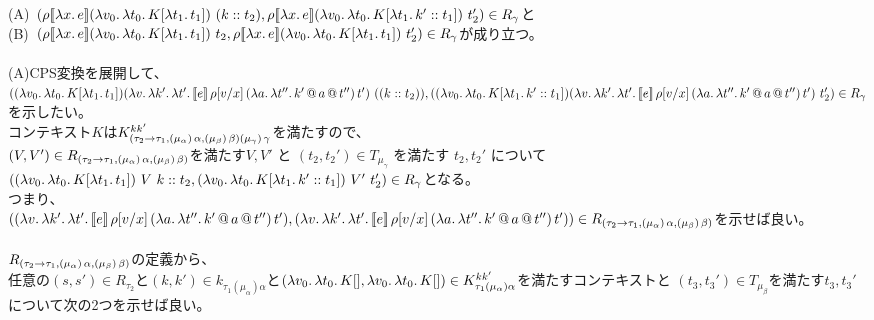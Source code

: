 \documentclass[japanese,draft]{jssst_ppl} %
\begin{document}
  (A)\ $(\rho \CPSTh{\Lam{x}{e}} \LamP{v_0}{\Lam{t_0}{K[\Lam{t_1}{t_1}]}}\ \ConsP{k}{t_2}, \rho \CPSTh{\Lam{x}{e}} \LamP{v_0}{\Lam{t_0}{K[\Lam{t_1}{\Cons{k'}{t_1}}]}}\ t_2')\in R_{\gamma}$と\\
  (B)\ $(\rho \CPSTh{\Lam{x}{e}} \LamP{v_0}{\Lam{t_0}{K[\Lam{t_1}{t_1}]}}\ t_2, \rho \CPSTh{\Lam{x}{e}} \LamP{v_0}{\Lam{t_0}{K[\Lam{t_1}{t_1}]}}\ t_2')\in R_{\gamma}$が成り立つ。\\
\\
(A)CPS変換を展開して、\\
$(\LamP{v_0}{\Lam{t_0}{K[\Lam{t_1}{t_1}]}}
          \LamP{v}{\Lam{k'}{\Lam{t'}{\CPS{e}{\rho[\Change{x}{v}]}
           {\LamP{a}{\Lam{t''}
               {\App{\App{k'}{a}}{t''}}}}{t'}}}}\ (\ConsP{k}{t_2}),\\
  (\LamP{v_0}{\Lam{t_0}{K[\Lam{t_1}{\Cons{k'}{t_1}}]}}
          \LamP{v}{\Lam{k'}{\Lam{t'}{\CPS{e}{\rho[\Change{x}{v}]}
           {\LamP{a}{\Lam{t''}
               {\App{\App{k'}{a}}{t''}}}}{t'}}}}\ t_2')\in R_{\gamma}$を示したい。\\
コンテキスト$K$は$K^{kk'}_{\ArrowTrailP{\tau_2}{\tau_1}{\TrailType{\alpha}}{\TrailType{\beta}} \TrailType{\gamma}}$を満たすので、\\
$(V,V')\in R_{\ArrowTrailP{\tau_2}{\tau_1}{\TrailType{\alpha}}{\TrailType{\beta}}}$を満たす$V,V'$ と $(t_2, t_2') \in T_{\mu_{\gamma}}$ を満たす $t_2, t_2'$ について\\
$(\LamP{v_0}{\Lam{t_0}{K[\Lam{t_1}{t_1}]}}\ V\ \Cons{k}{t_2}, \LamP{v_0}{\Lam{t_0}{K[\Lam{t_1}{\Cons{k'}{t_1}}]}}\ V'\ t_2')\in R_{\gamma}$となる。\\
つまり、\\
      $(\LamP{v}{\Lam{k'}{\Lam{t'}{\CPS{e}{\rho[\Change{x}{v}]}
           {\LamP{a}{\Lam{t''}
               {\App{\App{k'}{a}}{t''}}}}{t'}}}},\\
         \LamP{v}{\Lam{k'}{\Lam{t'}{\CPS{e}{\rho[\Change{x}{v}]}
           {\LamP{a}{\Lam{t''}
               {\App{\App{k'}{a}}{t''}}}}{t'}}}})\in R_{\ArrowTrailP{\tau_2}{\tau_1}{\TrailType{\alpha}}{\TrailType{\beta}}}$を示せば良い。\\
\\
$R_{\ArrowTrailP{\tau_2}{\tau_1}{\TrailType{\alpha}}{\TrailType{\beta}}}$の定義から、\\
任意の$(s,s')\in R_{\tau_2}$と$(k,k')\in k_{\tau_1(\mu_{\alpha})\alpha}$と$(\Lam{v_0}{\Lam{t_0}{K[]}}, \Lam{v_0}{\Lam{t_0}{K[]}})\in  K^{kk'}_{\tau_1(\mu_{\alpha})\alpha}$を満たすコンテキストと
$(t_3,t_3')\in T_{\mu_{\beta}}$を満たす$t_3, t_3'$について次の2つを示せば良い。\\
\end{document}
